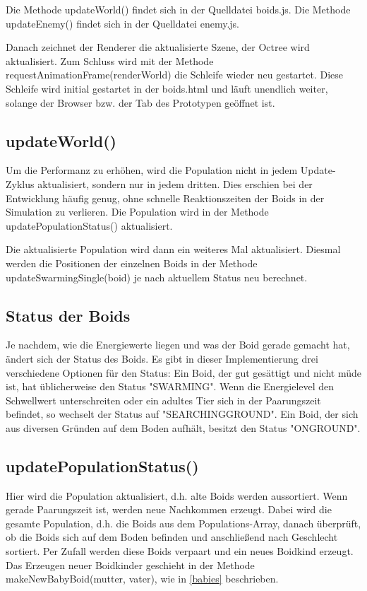 \documentclass[draft=false
              ,paper=a4
              ,twoside=false
              ,fontsize=11pt
              ,headsepline
              ,BCOR10mm
              ,DIV11
              ,bibtotoc
              ,liststotoc
              ]{scrbook}
\begin{document}
Die Methode updateWorld() findet sich in der Quelldatei boids.js. Die Methode updateEnemy() findet sich in der Quelldatei enemy.js.

Danach zeichnet der Renderer die aktualisierte Szene, der Octree wird aktualisiert. Zum Schluss wird mit der Methode requestAnimationFrame(renderWorld) die Schleife wieder neu gestartet. Diese Schleife wird initial gestartet in der boids.html und läuft unendlich weiter, solange der Browser bzw. der Tab des Prototypen geöffnet ist.

\subsection{updateWorld()}
Um die Performanz zu erhöhen, wird die Population nicht in jedem Update-Zyklus aktualisiert, sondern nur in jedem dritten. Dies erschien bei der Entwicklung häufig genug, ohne schnelle Reaktionszeiten der Boids in der Simulation zu verlieren. Die Population wird in der Methode updatePopulationStatus() aktualisiert.

Die aktualisierte Population wird dann ein weiteres Mal aktualisiert. Diesmal werden die Positionen der einzelnen Boids in der Methode updateSwarmingSingle(boid) je nach aktuellem Status neu berechnet.

\subsection{Status der Boids}
Je nachdem, wie die Energiewerte liegen und was der Boid gerade gemacht hat, ändert sich der Status des Boids. Es gibt in dieser Implementierung drei verschiedene Optionen für den Status:
Ein Boid, der gut gesättigt und nicht müde ist, hat üblicherweise den Status "{}SWARMING"{}. Wenn die Energielevel den Schwellwert unterschreiten oder ein adultes Tier sich in der Paarungszeit befindet, so wechselt der Status auf "{}SEARCHINGGROUND"{}. Ein Boid, der sich aus diversen Gründen auf dem Boden aufhält, besitzt den Status "{}ONGROUND"{}.

\subsection{updatePopulationStatus()}
 Hier wird die Population aktualisiert, d.h. alte Boids werden aussortiert. Wenn gerade Paarungszeit ist, werden neue Nachkommen erzeugt. Dabei wird die gesamte Population, d.h. die Boids aus dem Populations-Array, danach überprüft, ob die Boids sich auf dem Boden befinden und anschließend nach Geschlecht sortiert. Per Zufall werden diese Boids verpaart und ein neues Boidkind erzeugt. Das Erzeugen neuer Boidkinder geschieht in der Methode makeNewBabyBoid(mutter, vater), wie in \ref{babies} beschrieben.
\end{document}
